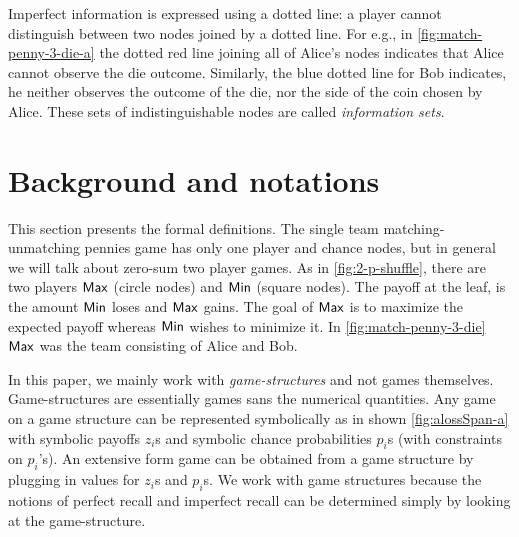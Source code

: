 Imperfect information is expressed using a dotted line: a player cannot distinguish between two nodes joined by a dotted line.
For e.g., in \cref{fig:match-penny-3-die-a} the dotted red line joining all of Alice's nodes indicates that Alice cannot observe the die outcome. Similarly, the blue dotted line for Bob indicates, he neither observes the outcome of the die, nor the side of the coin chosen by Alice. These sets of indistinguishable nodes are called \emph{information sets}.





\section{Background and notations}
\label{sec:background}


This section presents the formal definitions. The single team matching-unmatching pennies game has only one player and chance nodes, but in general we will talk about zero-sum two player games. As in \cref{fig:2-p-shuffle}, there are two players $\mathsf{Max}$ (circle nodes) and $\mathsf{Min}$ (square nodes). The payoff at the leaf, is the amount $\mathsf{Min}$ loses and $\mathsf{Max}$ gains. The goal of $\mathsf{Max}$ is to maximize the expected payoff whereas $\mathsf{Min}$ wishes to minimize it. In \cref{fig:match-penny-3-die} $\mathsf{Max}$ was the team consisting of Alice and Bob.







In this paper, we mainly work with \emph{game-structures} and not games
themselves. Game-structures are essentially games sans the numerical
quantities. Any game on a game structure can be represented symbolically as in shown \cref{fig:alossSpan-a} with symbolic payoffs $z_i$s and symbolic chance probabilities $p_i$s (with constraints on $p_i$'s). An extensive
form game can be obtained from a game structure by plugging in values for $z_i$s and $p_i$s.  We work with game structures because the
notions of perfect recall and imperfect recall can be determined
simply by looking at the game-structure.


